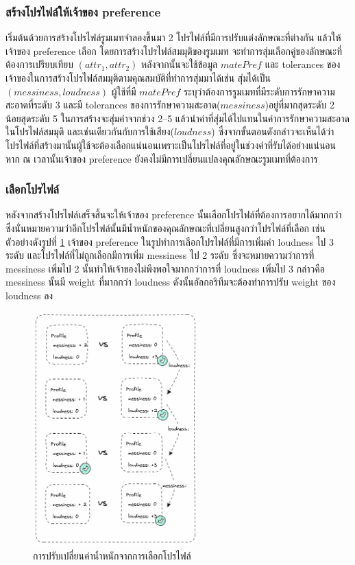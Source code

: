 \subsubsection{สร้างโปรไฟล์ให้เจ้าของ preference}
เริ่มต้นด้วยการสร้างโปรไฟล์รูมเมทจำลองขึ้นมา 2 โปรไฟล์ที่มีการปรับแต่งลักษณะที่ต่างกัน แล้วให้เจ้าของ preference เลือก 
โดยการสร้างโปรไฟล์สมมุติของรูมเมท จะทำการสุ่มเลือกคู่ของลักษณะที่ต้องการเปรียบเทียบ $(attr_1, attr_2)$ หลังจากนั้นจะใช้ข้อมูล 
$matePref$ และ tolerances ของเจ้าของในการสร้างโปรไฟล์สมมุติตามคุณสมบัติที่ทำการสุ่มมาได้เช่น สุ่มได้เป็น $(messiness, loudness)$ 
ผู้ใช้ที่มี $matePref$ ระบุว่าต้องการรูมเมทที่มีระดับการรักษาความสะอาดที่ระดับ 3 และมี tolerances ของการรักษาความสะอาด($messiness$)อยู่ที่มากสุดระดับ 2 
น้อยสุดระดับ 5 ในการสร้างจะสุ่มค่าจากช่วง 2--5 แล้วนำค่าที่สุ่มได้ไปแทนในค่าการรักษาความสะอาดในโปรไฟล์สมมุติ และเช่นเดียวกันกับการใช้เสียง($loudness$)
ซึ่งจากขั้นตอนดังกล่าวจะเห็นได้ว่าโปรไฟล์ที่สร้างมานั้นผู้ใช้จะต้องเลือกแน่นอนเพราะเป็นโปรไฟล์ที่อยู่ในช่วงค่าที่รับได้อย่างแน่นอน หาก ณ เวลานั้นเจ้าของ preference 
ยังคงไม่มีการเปลี่ยนแปลงคุณลักษณะรูมเมทที่ต้องการ

\subsubsection{เลือกโปรไฟล์}
หลังจากสร้างโปรไฟล์เสร็จสิ้นจะให้เจ้าของ preference นั้นเลือกโปรไฟล์ที่ต้องการอยากได้มากกว่า ซึ่งนั่นหมายความว่าอีกโปรไฟล์นั้นมีน้ำหนักของคุณลักษณะที่เปลี่ยนสูงกว่าโปรไฟล์ที่เลือก
เช่นตัวอย่างดังรูปที่ \ref{fig:weight-adjust} เจ้าของ preference ในรูปทำการเลือกโปรไฟล์ที่มีการเพิ่มค่า loudness ไป 3 ระดับ และโปรไฟล์ที่ไม่ถูกเลือกมีการเพิ่ม messiness ไป 2 ระดับ
ซึ่งจะหมายความว่าการที่ messiness เพิ่มไป 2 นั้นทำให้เจ้าของไม่พึงพอใจมากกว่าการที่ loudness เพิ่มไป 3 กล่าวคือ messiness นั้นมี weight ที่มากกว่า loudness
ดังนั้นอัลกอริทึมจะต้องทำการปรับ weight ของ loudness ลง

\begin{figure}[ht]
  \begin{center}
    \includegraphics[width=2.5in]{photo/diagram/weight_adjustment.png}
  \end{center}
  \caption{การปรับเปลี่ยนค่าน้ำหนักจากการเลือกโปรไฟล์}
  \label{fig:weight-adjust}
\end{figure}


